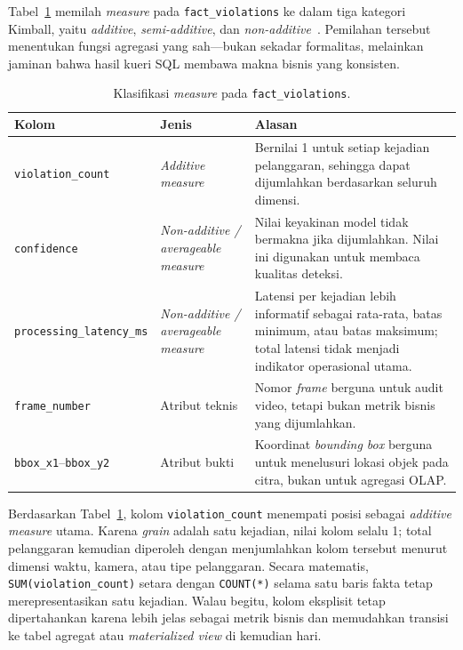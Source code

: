 Tabel~\ref{tab:klasifikasi-measure-dw} memilah \textit{measure} pada \texttt{fact\_violations} ke dalam tiga kategori Kimball, yaitu \textit{additive}, \textit{semi-additive}, dan \textit{non-additive}~\cite{kimball_additive_facts}. Pemilahan tersebut menentukan fungsi agregasi yang sah---bukan sekadar formalitas, melainkan jaminan bahwa hasil kueri SQL membawa makna bisnis yang konsisten.

\begin{table}[htbp]
\centering
\caption{Klasifikasi \textit{measure} pada \texttt{fact\_violations}.}
\label{tab:klasifikasi-measure-dw}
\footnotesize
\setlength{\tabcolsep}{4pt}
\renewcommand{\arraystretch}{1.18}
\begin{tabularx}{\textwidth}{>{\RaggedRight\arraybackslash}p{3.1cm} >{\RaggedRight\arraybackslash}p{3.0cm} >{\RaggedRight\arraybackslash}X}
\toprule
\textbf{Kolom} & \textbf{Jenis} & \textbf{Alasan} \\
\midrule
\texttt{violation\_count} & \textit{Additive measure} & Bernilai 1 untuk setiap kejadian pelanggaran, sehingga dapat dijumlahkan berdasarkan seluruh dimensi. \\
\texttt{confidence} & \textit{Non-additive / averageable measure} & Nilai keyakinan model tidak bermakna jika dijumlahkan. Nilai ini digunakan untuk membaca kualitas deteksi. \\
\texttt{processing\_latency\_ms} & \textit{Non-additive / averageable measure} & Latensi per kejadian lebih informatif sebagai rata-rata, batas minimum, atau batas maksimum; total latensi tidak menjadi indikator operasional utama. \\
\texttt{frame\_number} & Atribut teknis & Nomor \textit{frame} berguna untuk audit video, tetapi bukan metrik bisnis yang dijumlahkan. \\
\texttt{bbox\_x1}--\texttt{bbox\_y2} & Atribut bukti & Koordinat \textit{bounding box} berguna untuk menelusuri lokasi objek pada citra, bukan untuk agregasi OLAP. \\
\bottomrule
\end{tabularx}
\renewcommand{\arraystretch}{1.0}
\end{table}

Berdasarkan Tabel~\ref{tab:klasifikasi-measure-dw}, kolom \texttt{violation\_count} menempati posisi sebagai \textit{additive measure} utama. Karena \textit{grain} adalah satu kejadian, nilai kolom selalu 1; total pelanggaran kemudian diperoleh dengan menjumlahkan kolom tersebut menurut dimensi waktu, kamera, atau tipe pelanggaran. Secara matematis, \texttt{SUM(violation\_count)} setara dengan \texttt{COUNT(*)} selama satu baris fakta tetap merepresentasikan satu kejadian. Walau begitu, kolom eksplisit tetap dipertahankan karena lebih jelas sebagai metrik bisnis dan memudahkan transisi ke tabel agregat atau \textit{materialized view} di kemudian hari.

